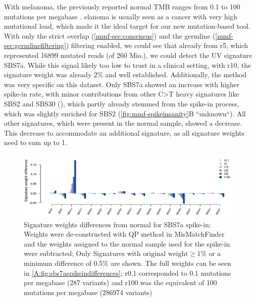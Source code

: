 With melanoma, the previously reported normal TMB ranges from 0.1 to 100 mutations per megabase \cite{Alexandrov2020}. elanoma is usually seen as a cancer with  very high mutational load, which made it the ideal target for our new mutation-based tool. With only the strict overlap (\autoref{mmf-sec:consensus}) and the germline (\autoref{mmf-sec:germlinefiltering}) filtering enabled, we could see that already from r5, which represented 16899 mutated reads (of 260 Mio.), we could detect the UV signature SBS7a. While this signal  likely  too low to trust in a clinical setting, with r10, the signature weight was already 2\% and well established. Additionally, the method was very specific on this dataset. Only SBS7a showed an increase with  higher spike-in rate, with minor contributions from other  C>T heavy signatures like SBS2 and SBS30 (), which partly already stemmed from the spike-in process, which was slightly enriched for SBS2 (\autoref{fig:mmf-spikeinsanity}B ``unknown``). All other signatures, which were present in the normal sample, showed a decrease. This decrease  to accommodate an additional signature, as all signature weights need to sum up to 1.


\begin{figure}[ht]
\centering
\includegraphics[width=.99\linewidth]{Figures/MisMatchFinder/SBS7SpikeInSignatureDifferencesFocussed.pdf}
\caption[Signature weights differences from normal for SBS7a spike-in]{Signature weights differences from normal for SBS7a spike-in; Weights were de-constructed with QP method in MisMatchFinder and the weights assigned to the normal sample used for the spike-in were subtracted; Only Signatures with $\text{original weight}\geq 1\%$ or a minimum difference of 0.5\% are shown. The full weights can be seen in \protect\autoref{A:fig:sbs7aspikeindifferences}; r0.1 corresponded to 0.1 mutations per megabase (287 variants) and r100 was the equivalent of 100 mutations per megabase (286974 variants)}\label{fig:mmf-spikeSBS7asignatures}
\end{figure}

